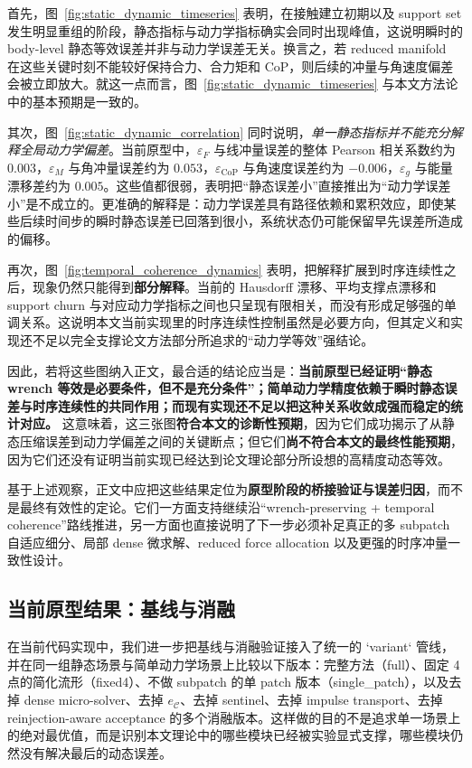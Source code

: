 首先，图~\ref{fig:static_dynamic_timeseries} 表明，在接触建立初期以及 support set 发生明显重组的阶段，静态指标与动力学指标确实会同时出现峰值，这说明瞬时的 body-level 静态等效误差并非与动力学误差无关。换言之，若 reduced manifold 在这些关键时刻不能较好保持合力、合力矩和 CoP，则后续的冲量与角速度偏差会被立即放大。就这一点而言，图~\ref{fig:static_dynamic_timeseries} 与本文方法论中的基本预期是一致的。

其次，图~\ref{fig:static_dynamic_correlation} 同时说明，\emph{单一静态指标并不能充分解释全局动力学偏差}。当前原型中，$\varepsilon_F$ 与线冲量误差的整体 Pearson 相关系数约为 $0.003$，$\varepsilon_M$ 与角冲量误差约为 $0.053$，$\varepsilon_{\mathrm{CoP}}$ 与角速度误差约为 $-0.006$，$\varepsilon_g$ 与能量漂移差约为 $0.005$。这些值都很弱，表明把“静态误差小”直接推出为“动力学误差小”是不成立的。更准确的解释是：动力学误差具有路径依赖和累积效应，即使某些后续时间步的瞬时静态误差已回落到很小，系统状态仍可能保留早先误差所造成的偏移。

再次，图~\ref{fig:temporal_coherence_dynamics} 表明，把解释扩展到时序连续性之后，现象仍然只能得到\textbf{部分解释}。当前的 Hausdorff 漂移、平均支撑点漂移和 support churn 与对应动力学指标之间也只呈现有限相关，而没有形成足够强的单调关系。这说明本文当前实现里的时序连续性控制虽然是必要方向，但其定义和实现还不足以完全支撑论文方法部分所追求的“动力学等效”强结论。

因此，若将这些图纳入正文，最合适的结论应当是：\textbf{当前原型已经证明“静态 wrench 等效是必要条件，但不是充分条件”；简单动力学精度依赖于瞬时静态误差与时序连续性的共同作用；而现有实现还不足以把这种关系收敛成强而稳定的统计对应。} 这意味着，这三张图\textbf{符合本文的诊断性预期}，因为它们成功揭示了从静态压缩误差到动力学偏差之间的关键断点；但它们\textbf{尚不符合本文的最终性能预期}，因为它们还没有证明当前实现已经达到论文理论部分所设想的高精度动态等效。

基于上述观察，正文中应把这些结果定位为\textbf{原型阶段的桥接验证与误差归因}，而不是最终有效性的定论。它们一方面支持继续沿“wrench-preserving + temporal coherence”路线推进，另一方面也直接说明了下一步必须补足真正的多 subpatch 自适应细分、局部 dense 微求解、reduced force allocation 以及更强的时序冲量一致性设计。

\subsection{当前原型结果：基线与消融}

在当前代码实现中，我们进一步把基线与消融验证接入了统一的 `variant` 管线，并在同一组静态场景与简单动力学场景上比较以下版本：完整方法（full）、固定 4 点的简化流形（fixed4）、不做 subpatch 的单 patch 版本（single\_patch），以及去掉 dense micro-solver、去掉 $e_{\mathcal{C}}$、去掉 sentinel、去掉 impulse transport、去掉 reinjection-aware acceptance 的多个消融版本。这样做的目的不是追求单一场景上的绝对最优值，而是识别本文理论中的哪些模块已经被实验显式支撑，哪些模块仍然没有解决最后的动态误差。

